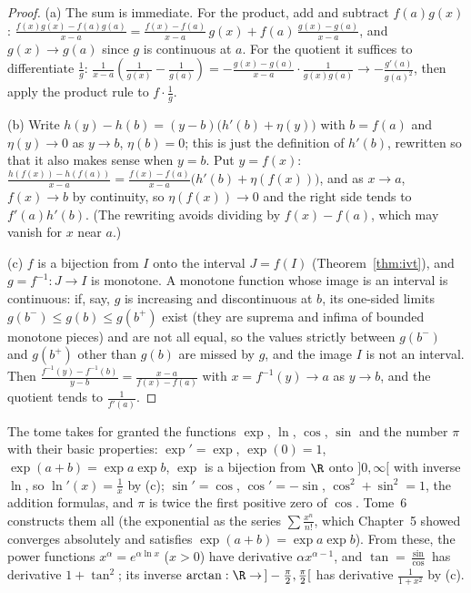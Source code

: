 \begin{proof}
(a) The sum is immediate. For the product, add and subtract $f(a)g(x)$:
$\frac{f(x)g(x)-f(a)g(a)}{x-a}=\frac{f(x)-f(a)}{x-a}\,g(x)+f(a)\,\frac{g(x)-g(a)}{x-a}$, and $g(x)\to g(a)$ since $g$ is continuous at $a$. For the quotient it suffices to differentiate $\frac1g$:
$\frac1{x-a}\left(\frac1{g(x)}-\frac1{g(a)}\right)=-\frac{g(x)-g(a)}{x-a}\cdot\frac1{g(x)g(a)}\to-\frac{g'(a)}{g(a)^2}$, then apply the product rule to $f\cdot\frac1g$.

(b) Write $h(y)-h(b)=(y-b)\bigl(h'(b)+\eta(y)\bigr)$ with $b=f(a)$ and $\eta(y)\to0$ as $y\to b$, $\eta(b)=0$; this is just the definition of $h'(b)$, rewritten so that it also makes sense when $y=b$. Put $y=f(x)$:
$\frac{h(f(x))-h(f(a))}{x-a}=\frac{f(x)-f(a)}{x-a}\bigl(h'(b)+\eta(f(x))\bigr)$, and as $x\to a$, $f(x)\to b$ by continuity, so $\eta(f(x))\to0$ and the right side tends to $f'(a)h'(b)$. (The rewriting avoids dividing by $f(x)-f(a)$, which may vanish for $x$ near $a$.)

(c) $f$ is a bijection from $I$ onto the interval $J=f(I)$ (Theorem~\ref{thm:ivt}), and $g=f^{-1}:J\to I$ is monotone. A monotone function whose image is an interval is continuous: if, say, $g$ is increasing and discontinuous at $b$, its one-sided limits $g(b^-)\le g(b)\le g(b^+)$ exist (they are suprema and infima of bounded monotone pieces) and are not all equal, so the values strictly between $g(b^-)$ and $g(b^+)$ other than $g(b)$ are missed by $g$, and the image $I$ is not an interval. Then
$\frac{f^{-1}(y)-f^{-1}(b)}{y-b}=\frac{x-a}{f(x)-f(a)}$ with $x=f^{-1}(y)\to a$ as $y\to b$, and the quotient tends to $\frac1{f'(a)}$.
\end{proof}

\begin{reminder}
The tome takes for granted the functions $\exp$, $\ln$, $\cos$, $\sin$ and the number $\pi$ with their basic properties: $\exp'=\exp$, $\exp(0)=1$, $\exp(a+b)=\exp a\exp b$, $\exp$ is a bijection from $\R$ onto $]0,\infty[$ with inverse $\ln$, so $\ln'(x)=\frac1x$ by (c); $\sin'=\cos$, $\cos'=-\sin$, $\cos^2+\sin^2=1$, the addition formulas, and $\pi$ is twice the first positive zero of $\cos$. Tome~6 constructs them all (the exponential as the series $\sum\frac{x^n}{n!}$, which Chapter~5 showed converges absolutely and satisfies $\exp(a+b)=\exp a\exp b$). From these, the power functions $x^\alpha=e^{\alpha\ln x}$ ($x>0$) have derivative $\alpha x^{\alpha-1}$, and $\tan=\frac{\sin}{\cos}$ has derivative $1+\tan^2$; its inverse $\arctan:\R\to\,]-\frac\pi2,\frac\pi2[$ has derivative $\frac1{1+x^2}$ by (c).
\end{reminder}

